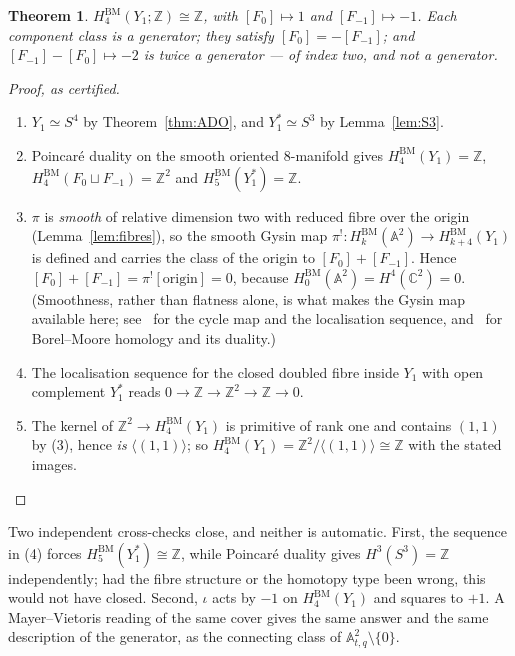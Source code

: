 \documentclass[11pt]{article}
\newtheorem{theorem}{Theorem}[section]
\theoremstyle{definition}
\theoremstyle{remark}
\newcommand{\C}{\mathbb{C}}
\newcommand{\Z}{\mathbb{Z}}
\newcommand{\Aff}[1]{\mathbb{A}^{#1}}
\newcommand{\HBM}[1]{H^{\mathrm{BM}}_{#1}}
\begin{document}
\begin{theorem}\label{thm:generator}
$\HBM{4}(Y_1;\Z)\cong\Z$, with $[F_0]\mapsto1$ and $[F_{-1}]\mapsto-1$. Each
component class is a \emph{generator}; they satisfy $[F_0]=-[F_{-1}]$; and
$[F_{-1}]-[F_0]\mapsto-2$ is twice a generator --- of index two, and not a
generator.
\end{theorem}

\begin{proof}[Proof, as certified]
\begin{enumerate}
\item[(1)] $Y_1\simeq S^4$ by Theorem~\ref{thm:ADO}, and $Y_1^{*}\simeq S^3$
by Lemma~\ref{lem:S3}.
\item[(2)] Poincar\'e duality on the smooth oriented $8$-manifold gives
$\HBM{4}(Y_1)=\Z$, $\HBM{4}(F_0\sqcup F_{-1})=\Z^2$ and
$\HBM{5}(Y_1^{*})=\Z$.
\item[(3)] $\pi$ is \emph{smooth} of relative dimension two with reduced fibre
over the origin (Lemma~\ref{lem:fibres}), so the smooth Gysin map
$\pi^{!}\colon\HBM{k}(\Aff{2})\to\HBM{k+4}(Y_1)$ is defined and carries the
class of the origin to $[F_0]+[F_{-1}]$. Hence
$[F_0]+[F_{-1}]=\pi^{!}[\text{origin}]=0$, because
$\HBM{0}(\Aff{2})=H^4(\C^2)=0$. (Smoothness, rather than flatness alone, is
what makes the Gysin map available here; see~\cite[\S19.1]{Fulton1998} for the
cycle map and the localisation sequence, and~\cite[\S2.6]{ChrissGinzburg1997}
for Borel--Moore homology and its duality.)
\item[(4)] The localisation sequence for the closed doubled fibre inside
$Y_1$ with open complement $Y_1^{*}$ reads $0\to\Z\to\Z^2\to\Z\to0$.
\item[(5)] The kernel of $\Z^2\to\HBM{4}(Y_1)$ is primitive of rank one and
contains $(1,1)$ by (3), hence \emph{is} $\langle(1,1)\rangle$; so
$\HBM{4}(Y_1)=\Z^2/\langle(1,1)\rangle\cong\Z$ with the stated images.
\end{enumerate}
\end{proof}

Two independent cross-checks close, and neither is automatic. First, the
sequence in (4) forces $\HBM{5}(Y_1^{*})\cong\Z$, while Poincar\'e duality
gives $H^3(S^3)=\Z$ independently; had the fibre structure or the homotopy
type been wrong, this would not have closed. Second, $\iota$ acts by $-1$ on
$\HBM{4}(Y_1)$ and squares to $+1$. A Mayer--Vietoris reading of the same
cover gives the same answer and the same description of the generator, as the
connecting class of $\Aff{2}_{t,q}\setminus\{0\}$.
\end{document}
